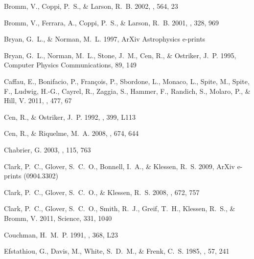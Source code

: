 \documentclass[apj]{emulateapj}
\begin{document}
\begin{thebibliography}{108}
{Bromm}, V., {Coppi}, P.~S., \& {Larson}, R.~B. 2002, \apj, 564, 23

{Bromm}, V., {Ferrara}, A., {Coppi}, P.~S., \& {Larson}, R.~B. 2001, \mnras,
  328, 969

{Bryan}, G.~L., \& {Norman}, M.~L. 1997, ArXiv Astrophysics e-prints

{Bryan}, G.~L., {Norman}, M.~L., {Stone}, J.~M., {Cen}, R., \& {Ostriker},
  J.~P. 1995, Computer Physics Communications, 89, 149

{Caffau}, E., {Bonifacio}, P., {Fran{\c c}ois}, P., {Sbordone}, L., {Monaco},
  L., {Spite}, M., {Spite}, F., {Ludwig}, H.-G., {Cayrel}, R., {Zaggia}, S.,
  {Hammer}, F., {Randich}, S., {Molaro}, P., \& {Hill}, V. 2011, \nat, 477, 67

{Cen}, R., \& {Ostriker}, J.~P. 1992, \apjl, 399, L113

{Cen}, R., \& {Riquelme}, M.~A. 2008, \apj, 674, 644

{Chabrier}, G. 2003, \pasp, 115, 763

{Clark}, P.~C., {Glover}, S.~C.~O., {Bonnell}, I.~A., \& {Klessen}, R.~S. 2009,
  ArXiv e-prints (0904.3302)

{Clark}, P.~C., {Glover}, S.~C.~O., \& {Klessen}, R.~S. 2008, \apj, 672, 757

{Clark}, P.~C., {Glover}, S.~C.~O., {Smith}, R.~J., {Greif}, T.~H., {Klessen},
  R.~S., \& {Bromm}, V. 2011, Science, 331, 1040

{Couchman}, H.~M.~P. 1991, \apjl, 368, L23

{Efstathiou}, G., {Davis}, M., {White}, S.~D.~M., \& {Frenk}, C.~S. 1985,
  \apjs, 57, 241


\end{thebibliography}
\end{document}
